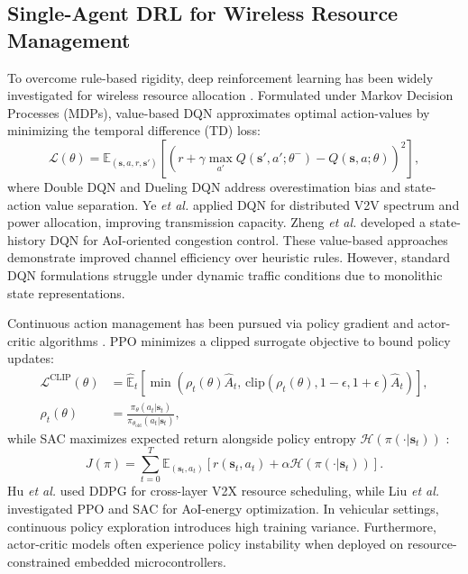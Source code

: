 \documentclass[journal]{IEEEtran}
\begin{document}
\subsection{Single-Agent DRL for Wireless Resource Management}
To overcome rule-based rigidity, deep reinforcement learning has been widely investigated for wireless resource allocation \cite{Ye2019Deep, Hu2021Deep, Mnih2015Human}. Formulated under Markov Decision Processes (MDPs), value-based DQN approximates optimal action-values by minimizing the temporal difference (TD) loss:
\begin{equation}
\label{eq:dqn_loss}
\mathcal{L}(\theta) = \mathbb{E}_{(\mathbf{s}, a, r, \mathbf{s}')} \left[ \left( r + \gamma \max_{a'} Q(\mathbf{s}', a'; \theta^-) - Q(\mathbf{s}, a; \theta) \right)^2 \right],
\end{equation}
where Double DQN \cite{VanHasselt2016Deep} and Dueling DQN \cite{Wang2016Dueling} address overestimation bias and state-action value separation. Ye \textit{et al.} \cite{Ye2019Deep} applied DQN for distributed V2V spectrum and power allocation, improving transmission capacity. Zheng \textit{et al.} \cite{Zheng2022Age} developed a state-history DQN for AoI-oriented congestion control. These value-based approaches demonstrate improved channel efficiency over heuristic rules. However, standard DQN formulations struggle under dynamic traffic conditions due to monolithic state representations.

Continuous action management has been pursued via policy gradient and actor-critic algorithms \cite{Hu2021Deep, Liu2024Age}. PPO minimizes a clipped surrogate objective to bound policy updates:
\begin{align}
\label{eq:ppo_clip}
\mathcal{L}^{\text{CLIP}}(\theta) &= \hat{\mathbb{E}}_t \left[ \min\left( \rho_t(\theta)\hat{A}_t, \, \text{clip}(\rho_t(\theta), 1-\epsilon, 1+\epsilon)\hat{A}_t \right) \right], \\
\label{eq:ppo_rho}
\rho_t(\theta) &= \frac{\pi_\theta(a_t|\mathbf{s}_t)}{\pi_{\theta_{\text{old}}}(a_t|\mathbf{s}_t)},
\end{align}
while SAC maximizes expected return alongside policy entropy $\mathcal{H}(\pi(\cdot|\mathbf{s}_t))$ \cite{Liu2024Age}:
\begin{equation}
\label{eq:sac_obj}
J(\pi) = \sum_{t=0}^T \mathbb{E}_{(\mathbf{s}_t, a_t)} \left[ r(\mathbf{s}_t, a_t) + \alpha \mathcal{H}(\pi(\cdot|\mathbf{s}_t)) \right].
\end{equation}
Hu \textit{et al.} \cite{Hu2021Deep} used DDPG for cross-layer V2X resource scheduling, while Liu \textit{et al.} \cite{Liu2024Age} investigated PPO and SAC for AoI-energy optimization. In vehicular settings, continuous policy exploration introduces high training variance. Furthermore, actor-critic models often experience policy instability when deployed on resource-constrained embedded microcontrollers.
\end{document}
